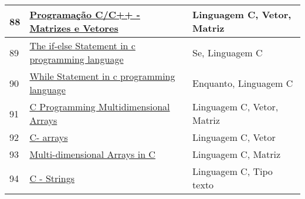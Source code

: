 \begin{longtable}{| p{} | p{} | p{} |}
88  & \href{https://www.inf.pucrs.br/~pinho/LaproI/Vetores/Vetores.htm}{\color{blue} Programação C/C++ - Matrizes e Vetores                                              } & Linguagem C, Vetor, Matriz                                                                                                                        \\ \hline
89  & \href{https://www.learnconline.com/2010/03/if-else-statement-c-programming-language.html}{\color{blue} The if-else Statement in c programming language                                     } & Se, Linguagem C                                                                                                                                   \\ \hline
90  & \href{https://www.learnconline.com/2010/03/while-loop-statement-in-c.html}{\color{blue} While Statement in c programming language                                           } & Enquanto, Linguagem C                                                                                                                             \\ \hline
91  & \href{https://www.programiz.com/c-programming/c-multi-dimensional-arrays}{\color{blue} C Programming Multidimensional Arrays                                               } & Linguagem C, Vetor, Matriz                                                                                                                        \\ \hline
92  & \href{https://www.tutorialspoint.com/cprogramming/c\_arrays.htm}{\color{blue} C- arrays                                                                           } & Linguagem C, Vetor                                                                                                                                \\ \hline
93  & \href{https://www.tutorialspoint.com/cprogramming/c\_multi\_dimensional\_arrays.htm}{\color{blue} Multi-dimensional Arrays in C                                                       } & Linguagem C, Matriz                                                                                                                               \\ \hline
94  & \href{https://www.tutorialspoint.com/cprogramming/c\_strings.htm}{\color{blue} C - Strings                                                                         } & Linguagem C, Tipo texto                                                                                                                           \\ \hline

\end{longtable}
